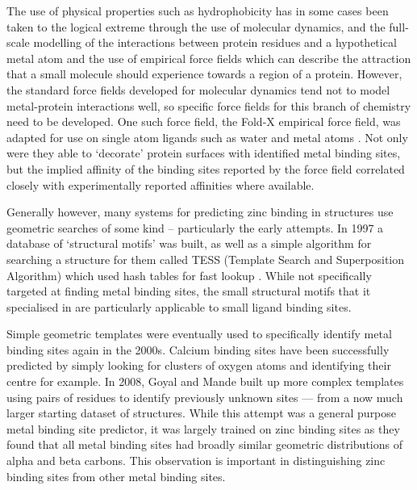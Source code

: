 The use of physical properties such as hydrophobicity has in some cases been taken to the logical extreme through the use of molecular dynamics, and the full-scale modelling of the interactions between protein residues and a hypothetical metal atom and the use of empirical force fields which can describe the attraction that a small molecule should experience towards a region of a protein. However, the standard force fields developed for molecular dynamics tend not to model metal-protein interactions well, so specific force fields for this branch of chemistry need to be developed. One such force field, the Fold-X empirical force field, was adapted for use on single atom ligands such as water and metal atoms \cite{schymkowitz2005}. Not only were they able to `decorate' protein surfaces with identified metal binding sites, but the implied affinity of the binding sites reported by the force field correlated closely with experimentally reported affinities where available.

Generally however, many systems for predicting zinc binding in structures use geometric searches of some kind -- particularly the early attempts. In 1997 a database of `structural motifs' was built, as well as a simple algorithm for searching a structure for them called TESS (Template Search and Superposition Algorithm) which used hash tables for fast lookup \cite{wallace1997tess}. While not specifically targeted at finding metal binding sites, the small structural motifs that it specialised in are particularly applicable to small ligand binding sites.

Simple geometric templates were eventually used to specifically identify metal binding sites again in the 2000s. Calcium binding sites have been successfully predicted by simply looking for clusters of oxygen atoms and identifying their centre \cite{deng2006} for example. In 2008, Goyal and Mande built up more complex templates using pairs of residues to identify previously unknown sites --- from a now much larger starting dataset of structures. While this attempt was a general purpose metal binding site predictor, it was largely trained on zinc binding sites as they found that all metal binding sites had broadly similar geometric distributions of alpha and beta carbons. This observation is important in distinguishing zinc binding sites from other metal binding sites.

